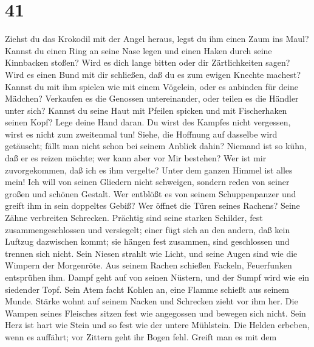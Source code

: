 \hypertarget{section-40}{%
\section{41}\label{section-40}}

 Ziehst du das Krokodil mit der Angel heraus, legst du ihm
einen Zaum ins Maul?  Kannst du einen Ring an seine Nase
legen und einen Haken durch seine Kinnbacken stoßen?  Wird
es dich lange bitten oder dir Zärtlichkeiten sagen?  Wird
es einen Bund mit dir schließen, daß du es zum ewigen Knechte machest?
 Kannst du mit ihm spielen wie mit einem Vögelein, oder es
anbinden für deine Mädchen?  Verkaufen es die Genossen
untereinander, oder teilen es die Händler unter sich? 
Kannst du seine Haut mit Pfeilen spicken und mit Fischerhaken seinen
Kopf?  Lege deine Hand daran. Du wirst des Kampfes nicht
vergessen, wirst es nicht zum zweitenmal tun!  Siehe, die
Hoffnung auf dasselbe wird getäuscht; fällt man nicht schon bei seinem
Anblick dahin?  Niemand ist so kühn, daß er es reizen
möchte; wer kann aber vor Mir bestehen?  Wer ist mir
zuvorgekommen, daß ich es ihm vergelte? Unter dem ganzen Himmel ist
alles mein!  Ich will von seinen Gliedern nicht
schweigen, sondern reden von seiner großen und schönen Gestalt.
 Wer entblößt es von seinem Schuppenpanzer und greift ihm
in sein doppeltes Gebiß?  Wer öffnet die Türen seines
Rachens? Seine Zähne verbreiten Schrecken.  Prächtig sind
seine starken Schilder, fest zusammengeschlossen und versiegelt;
 einer fügt sich an den andern, daß kein Luftzug
dazwischen kommt;  sie hängen fest zusammen, sind
geschlossen und trennen sich nicht.  Sein Niesen strahlt
wie Licht, und seine Augen sind wie die Wimpern der Morgenröte.
 Aus seinem Rachen schießen Fackeln, Feuerfunken
entsprühen ihm.  Dampf geht auf von seinen Nüstern, und
der Sumpf wird wie ein siedender Topf.  Sein Atem facht
Kohlen an, eine Flamme schießt aus seinem Munde.  Stärke
wohnt auf seinem Nacken und Schrecken zieht vor ihm her. 
Die Wampen seines Fleisches sitzen fest wie angegossen und bewegen sich
nicht.  Sein Herz ist hart wie Stein und so fest wie der
untere Mühlstein.  Die Helden erbeben, wenn es auffährt;
vor Zittern geht ihr Bogen fehl.  Greift man es mit dem
